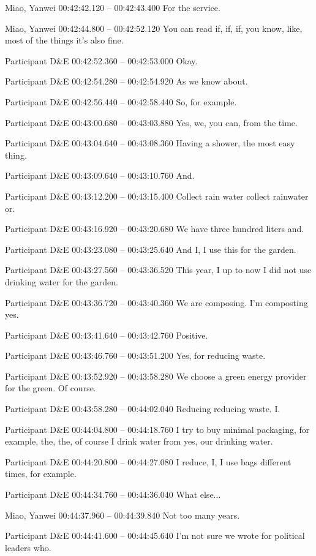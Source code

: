 {Miao, Yanwei 00:42:42.120 -- 00:42:43.400
For the service.

Miao, Yanwei 00:42:44.800 -- 00:42:52.120
You can read if, if, if, you know, like, most of the things it's also fine.

Participant D\&E 00:42:52.360 -- 00:42:53.000
Okay.

Participant D\&E 00:42:54.280 -- 00:42:54.920
As we know about.

Participant D\&E 00:42:56.440 -- 00:42:58.440
So, for example.

Participant D\&E 00:43:00.680 -- 00:43:03.880
Yes, we, you can, from the time.

Participant D\&E 00:43:04.640 -- 00:43:08.360
Having a shower, the most easy thing.

Participant D\&E 00:43:09.640 -- 00:43:10.760
And.

Participant D\&E 00:43:12.200 -- 00:43:15.400
Collect rain water collect rainwater or.

Participant D\&E 00:43:16.920 -- 00:43:20.680
We have three hundred liters and.

Participant D\&E 00:43:23.080 -- 00:43:25.640
And I, I use this for the garden.

Participant D\&E 00:43:27.560 -- 00:43:36.520
This year, I up to now I did not use drinking water for the garden.

Participant D\&E 00:43:36.720 -- 00:43:40.360
We are composing. I'm composting yes.

Participant D\&E 00:43:41.640 -- 00:43:42.760
Positive.

Participant D\&E 00:43:46.760 -- 00:43:51.200
Yes, for reducing waste.

Participant D\&E 00:43:52.920 -- 00:43:58.280
We choose a green energy provider for the green. Of course.

Participant D\&E 00:43:58.280 -- 00:44:02.040
Reducing reducing waste. I.

Participant D\&E 00:44:04.800 -- 00:44:18.760
I try to buy minimal packaging, for example, the, the, of course I drink water from yes, our drinking water.

Participant D\&E 00:44:20.800 -- 00:44:27.080
I reduce, I, I use bags different times, for example.

Participant D\&E 00:44:34.760 -- 00:44:36.040
What else...

Miao, Yanwei 00:44:37.960 -- 00:44:39.840
Not too many years.

Participant D\&E 00:44:41.600 -- 00:44:45.640
I'm not sure we wrote for political leaders who.

}
